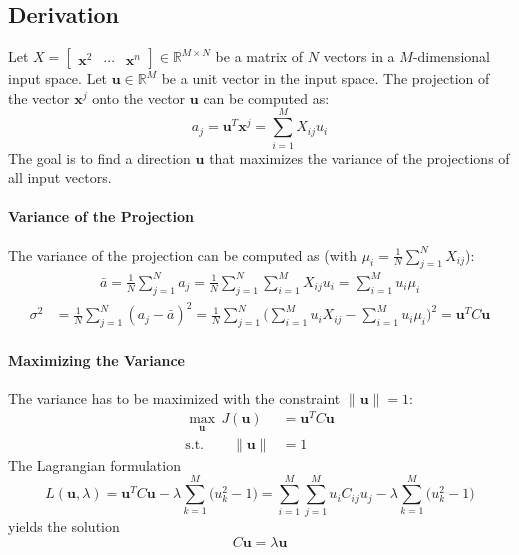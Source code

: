\documentclass[a4paper, 11pt, accentcolor = tud3b]{tudreport}
\newcommand{\R}{\ensuremath{\mathbb{R}}}
\renewcommand{\vec}[1]{\mathbf{#1}}
\begin{document}
			\subsection{Derivation}
				Let \( X = \begin{bmatrix} \vec{x}^2 & \cdots & \vec{x}^n \end{bmatrix} \in \R^{M \times N} \) be a matrix of \(N\) vectors in a \(M\)-dimensional input space. Let \( \vec{u} \in \R^M \) be a unit vector in the input space. The projection of the vector \( \vec{x}^j \) onto the vector \(\vec{u}\) can be computed as:
				\begin{equation}
					a_j = \vec{u}^T \vec{x}^j = \sum_{i = 1}^{M} X_{ij} u_i
				\end{equation}
				The goal is to find a direction \(\vec{u}\) that maximizes the variance of the projections of all input vectors.

				\paragraph{Variance of the Projection} %
					The variance of the projection can be computed as (with \( \mu_i = \frac{1}{N} \sum_{j = 1}^{N} X_{ij} \)):
					\begin{align}
						\bar{a} = \frac{1}{N} \sum_{j = 1}^{N} a_j = \frac{1}{N} \sum_{j = 1}^{N} \sum_{i = 1}^{M} X_{ij} u_i = \sum_{i = 1}^{M} u_i \mu_i
					\end{align}
					\begin{align}
						\sigma^2 &= \frac{1}{N} \sum_{j = 1}^{N} (a_j - \bar{a})^2 = \frac{1}{N} \sum_{j = 1}^{N} \Bigg( \sum_{i = 1}^{M} u_i X_{ij} - \sum_{i = 1}^{M} u_i \mu_i \Bigg)^2 = \vec{u}^T C \vec{u}
					\end{align}

				\paragraph{Maximizing the Variance}
					The variance has to be maximized with the constraint \( \lVert \vec{u} \rVert = 1 \):
					\begin{align}
						\max_{\vec{u}} \, J(\vec{u}) &= \vec{u}^T C \vec{u} \\
						\textrm{s.t.} \qquad
						\lVert \vec{u} \rVert & = 1
					\end{align}
					The Lagrangian formulation
					\begin{equation}
						L(\vec{u}, \lambda) = \vec{u}^T C \vec{u} - \lambda \sum_{k = 1}^{M} \big(u_k^2 - 1\big) = \sum_{i = 1}^{M} \sum_{j = 1}^{M} u_i C_{ij} u_j - \lambda \sum_{k = 1}^{M} \big(u_k^2 - 1\big)
					\end{equation}
					yields the solution
					\begin{equation}
						C\vec{u} = \lambda\vec{u}
					\end{equation}
					
\end{document}
